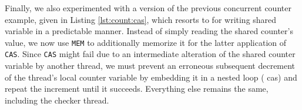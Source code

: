 Finally, we also experimented with a  version of the previous concurrent counter example, given in Listing \ref{lst:count:cas}, which resorts to  for writing  shared variable in a predictable manner.
Instead of simply reading the shared counter's value, we now use \lstinline[style=asm]{MEM} to additionally memorize it for the latter application of \lstinline[style=asm]{CAS}.
Since \lstinline[style=asm]{CAS} might fail due to an intermediate alteration of the shared counter variable by another thread, we must prevent an erroneous subsequent decrement of the thread's local counter variable by embedding it in a nested loop ( {\color{red!60!black}\textsf{cas}})
and repeat the increment until it succeeds. %
Everything else remains the same, including the checker thread.

\vfill

